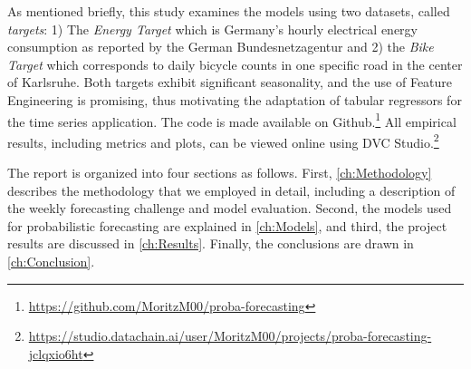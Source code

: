 As mentioned briefly, this study examines the models using two datasets, called \textit{targets}: 1) The \textit{Energy Target} which is Germany's hourly electrical energy consumption \parencite{noauthor_smard_2025} as reported by the German Bundesnetzagentur and 2) the \textit{Bike Target} which corresponds to daily bicycle counts in one specific road in the center of Karlsruhe. Both targets exhibit significant seasonality, and the use of Feature Engineering is promising, thus motivating the adaptation of tabular regressors for the time series application.
The code is made available on Github.\footnote{\href{https://github.com/MoritzM00/proba-forecasting}{https://github.com/MoritzM00/proba-forecasting}} All empirical results, including metrics and plots, can be viewed online using DVC Studio.\footnote{\href{https://studio.datachain.ai/user/MoritzM00/projects/proba-forecasting-jclqxio6ht}{https://studio.datachain.ai/user/MoritzM00/projects/proba-forecasting-jclqxio6ht}}

The report is organized into four sections as follows. First, \cref{ch:Methodology} describes the methodology that we employed in detail, including a description of the weekly forecasting challenge and model evaluation. Second, the models used for probabilistic forecasting are explained in \cref{ch:Models}, and third, the project results are discussed in \cref{ch:Results}. Finally, the conclusions are drawn in \cref{ch:Conclusion}.